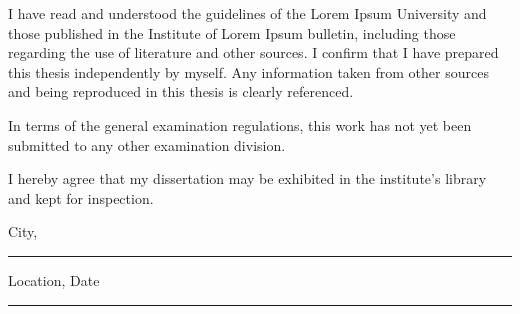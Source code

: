 I have read and understood the guidelines of the Lorem Ipsum University and those published in the Institute of Lorem Ipsum bulletin, including those regarding the use of literature and other sources. 
I confirm that I have prepared this thesis independently by myself. 
Any information taken from other sources and being reproduced in this thesis is clearly referenced.
\vspace{7.5ex}

\noindent
In terms of the general examination regulations, this work has not yet been submitted to any other examination division.
\vspace{7.5ex}

\noindent
I hereby agree that my dissertation may be exhibited in the institute's library and kept for inspection. 

\makeatletter
\vspace{15ex}
\parbox{0.475\textwidth}{\centering City, \britishdate{} \hrule\strut\centering\footnotesize Location, Date} \hfill
\parbox{0.475\textwidth}{ \hrule\strut\centering\footnotesize \@author}
\makeatother
\vfill

